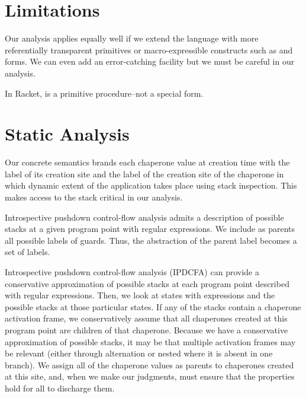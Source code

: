 \documentclass{sigplanconf}
\begin{document}
\section{Limitations}

Our analysis applies equally well if we extend the language with more referentially transparent primitives or macro-expressible constructs such as  and  forms.
We can even add an error-catching facility but we must be careful in our analysis.

In Racket,  is a primitive procedure--not a special form.


\section{Static Analysis}

Our concrete semantics brands each chaperone value at creation time with the label of its creation site and the label of the creation site of the chaperone in which dynamic extent of the application takes place using stack inspection. This makes access to the stack critical in our analysis.

Introspective pushdown control-flow analysis admits a description of possible stacks at a given program point with regular expressions. We include as parents all possible labels of guards. Thus, the abstraction of the parent label becomes a set of labels.



Introspective pushdown control-flow analysis (IPDCFA) can provide a conservative approximation of possible stacks at each program point described with regular expressions. Then, we look at states with expressions  and the possible stacks at those particular states. If any of the stacks contain a chaperone activation frame, we conservatively assume that all chaperones created at this program point are children of that chaperone. Because we have a conservative approximation of possible stacks, it may be that multiple activation frames may be relevant (either through alternation or nested where it is absent in one branch). We assign all of the chaperone values as parents to chaperones created at this site, and, when we make our judgments, must ensure that the properties hold for all to discharge them.
\end{document}

